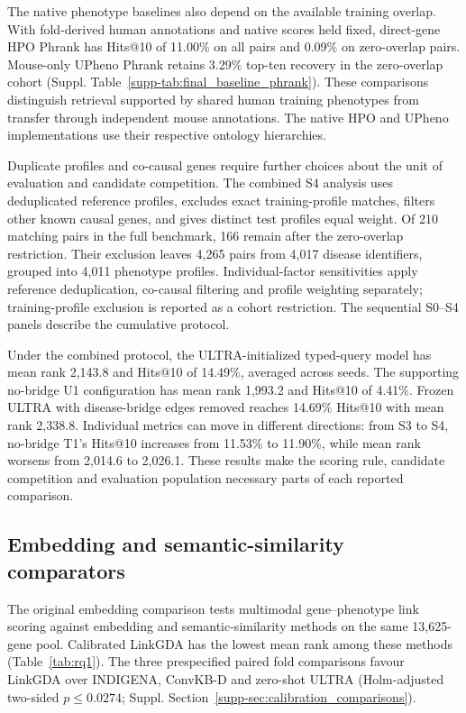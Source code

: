 \documentclass[webpdf,contemporary,large]{oup-authoring-template}%
\theoremstyle{thmstyleone}%
\theoremstyle{thmstyletwo}%
\theoremstyle{thmstylethree}%
\newcommand{\method}{LinkGDA}
\begin{document}
The native phenotype baselines also depend on the available training overlap.
With fold-derived human annotations and native scores held fixed,
direct-gene HPO Phrank has Hits@10 of 11.00\% on all pairs and 0.09\% on
zero-overlap pairs. Mouse-only UPheno Phrank retains 3.29\% top-ten recovery
in the zero-overlap cohort (Suppl. Table~\ref{supp-tab:final_baseline_phrank}).
These comparisons distinguish retrieval supported by shared human training
phenotypes from transfer through independent mouse annotations. The native
HPO and UPheno implementations use their respective ontology hierarchies.

Duplicate profiles and co-causal genes require further choices about the
unit of evaluation and candidate competition. The combined S4 analysis uses
deduplicated reference profiles, excludes exact training-profile matches,
filters other known causal genes, and gives distinct test profiles equal
weight. Of 210 matching pairs in the full benchmark, 166 remain after the
zero-overlap restriction. Their exclusion leaves 4{,}265 pairs from 4{,}017
disease identifiers, grouped into 4{,}011 phenotype profiles. Individual-factor
sensitivities apply reference deduplication, co-causal filtering and profile
weighting separately; training-profile exclusion is reported as a cohort
restriction. The sequential S0--S4 panels describe the cumulative protocol.

Under the combined protocol, the ULTRA-initialized typed-query model has
mean rank 2{,}143.8 and Hits@10 of 14.49\%, averaged across seeds.
The supporting no-bridge U1 configuration has mean rank 1{,}993.2
and Hits@10 of 4.41\%. Frozen ULTRA with disease-bridge edges removed reaches 14.69\%
Hits@10 with mean rank 2{,}338.8. Individual metrics can move in different
directions: from S3 to S4, no-bridge T1's Hits@10 increases from 11.53\% to
11.90\%, while mean rank worsens from 2{,}014.6 to 2{,}026.1. These results
make the scoring rule, candidate competition and evaluation population
necessary parts of each reported comparison.


\subsection{Embedding and semantic-similarity comparators}

The original embedding comparison tests multimodal gene--phenotype link
scoring against embedding and semantic-similarity methods on the same
13{,}625-gene pool. Calibrated \method{} has the lowest mean rank among
these methods (Table~\ref{tab:rq1}). The three prespecified paired fold
comparisons favour \method{} over INDIGENA, ConvKB-D and zero-shot ULTRA
(Holm-adjusted two-sided $p\leq0.0274$; Suppl.
Section~\ref{supp-sec:calibration_comparisons}).
\end{document}

